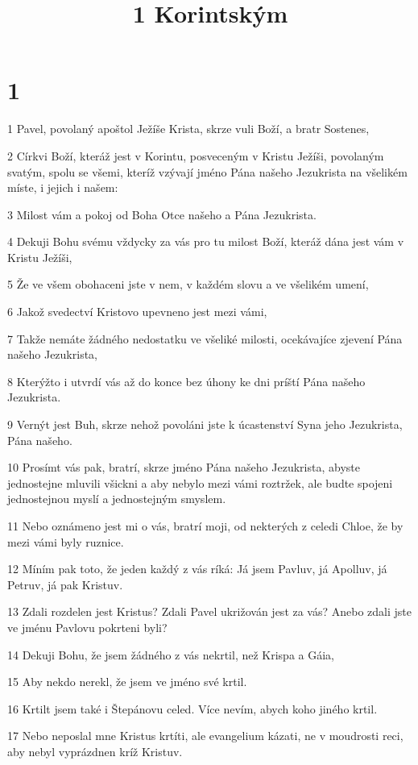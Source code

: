 

\title{1 Korintským}

\chapter{1}

\par 1 Pavel, povolaný apoštol Ježíše Krista, skrze vuli Boží, a bratr Sostenes,
\par 2 Církvi Boží, kteráž jest v Korintu, posveceným v Kristu Ježíši, povolaným svatým, spolu se všemi, kteríž vzývají jméno Pána našeho Jezukrista na všelikém míste, i jejich i našem:
\par 3 Milost vám a pokoj od Boha Otce našeho a Pána Jezukrista.
\par 4 Dekuji Bohu svému vždycky za vás pro tu milost Boží, kteráž dána jest vám v Kristu Ježíši,
\par 5 Že ve všem obohaceni jste v nem, v každém slovu a ve všelikém umení,
\par 6 Jakož svedectví Kristovo upevneno jest mezi vámi,
\par 7 Takže nemáte žádného nedostatku ve všeliké milosti, ocekávajíce zjevení Pána našeho Jezukrista,
\par 8 Kterýžto i utvrdí vás až do konce bez úhony ke dni príští Pána našeho Jezukrista.
\par 9 Vernýt jest Buh, skrze nehož povoláni jste k úcastenství Syna jeho Jezukrista, Pána našeho.
\par 10 Prosímt vás pak, bratrí, skrze jméno Pána našeho Jezukrista, abyste jednostejne mluvili všickni a aby nebylo mezi vámi roztržek, ale budte spojeni jednostejnou myslí a jednostejným smyslem.
\par 11 Nebo oznámeno jest mi o vás, bratrí moji, od nekterých z celedi Chloe, že by mezi vámi byly ruznice.
\par 12 Míním pak toto, že jeden každý z vás ríká: Já jsem Pavluv, já Apolluv, já Petruv, já pak Kristuv.
\par 13 Zdali rozdelen jest Kristus? Zdali Pavel ukrižován jest za vás? Anebo zdali jste ve jménu Pavlovu pokrteni byli?
\par 14 Dekuji Bohu, že jsem žádného z vás nekrtil, než Krispa a Gáia,
\par 15 Aby nekdo nerekl, že jsem ve jméno své krtil.
\par 16 Krtilt jsem také i Štepánovu celed. Více nevím, abych koho jiného krtil.
\par 17 Nebo neposlal mne Kristus krtíti, ale evangelium kázati, ne v moudrosti reci, aby nebyl vyprázdnen kríž Kristuv.

